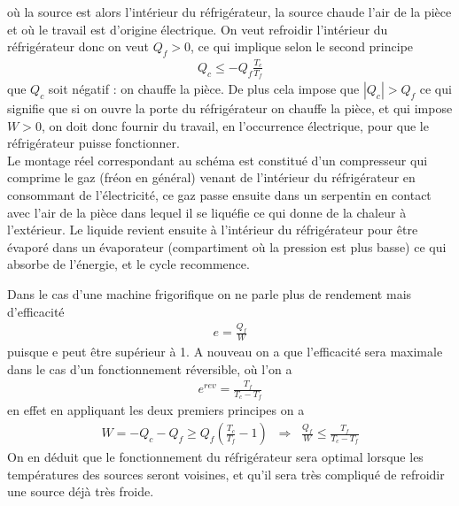 \documentclass[12pt,prb,aps,epsf]{report}
\begin{document}
où la source est alors l'intérieur du réfrigérateur, la source chaude l'air de la pièce et où le travail est d'origine électrique. On veut refroidir l'intérieur du réfrigérateur donc on veut $Q_f>0$, ce qui implique selon le second principe 
\begin{eqnarray}
Q_c \leq - Q_f \frac{T_c}{T_f}
\end{eqnarray}
que $Q_c$ soit négatif : on chauffe la pièce. De plus cela impose que $|Q_c|>Q_f $ ce qui signifie que si on ouvre la porte du réfrigérateur on chauffe la pièce, et qui impose $W>0$, on doit donc fournir du travail, en l'occurrence électrique, pour que le réfrigérateur puisse fonctionner.\\

Le montage réel correspondant au schéma est constitué d'un compresseur qui comprime le gaz (fréon en général) venant de l'intérieur du réfrigérateur en consommant de l'électricité, ce gaz passe ensuite dans un serpentin en contact avec l'air de la pièce dans lequel il se liquéfie ce qui donne de la chaleur à l'extérieur. Le liquide revient ensuite à l'intérieur du réfrigérateur pour être évaporé dans un évaporateur (compartiment où la pression est plus basse) ce qui absorbe de l'énergie, et le cycle recommence.

Dans le cas d'une machine frigorifique on ne parle plus de rendement mais d'efficacité 
\begin{eqnarray}
e = \frac{Q_f}{W}
\end{eqnarray}
puisque e peut être supérieur à 1. A nouveau on a que l'efficacité sera maximale dans le cas d'un fonctionnement réversible, où l'on a 
\begin{eqnarray}
e^{rev} = \frac{T_f}{T_c-T_f}
\end{eqnarray}
en effet en appliquant les deux premiers principes on a
\begin{eqnarray}
W = -Q_c-Q_f \geq Q_f\left(\frac{T_c}{T_f} - 1\right)\;\; \Longrightarrow\;\; \frac{Q_f}{W} \leq \frac{T_f}{T_c-T_f} 
\end{eqnarray}
On en déduit que le fonctionnement du réfrigérateur sera optimal lorsque les températures des sources seront voisines, et qu'il sera très compliqué de refroidir une source déjà très froide.
\end{document}
